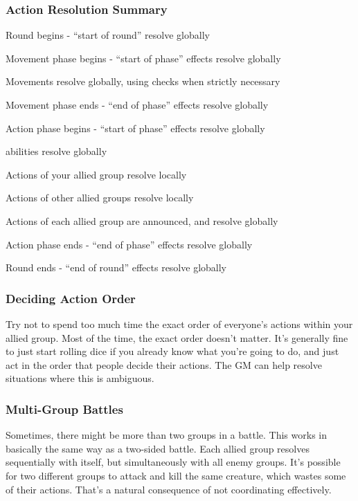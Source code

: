     \subsubsection{Action Resolution Summary}
      \begin{enumerate*}
        \item Round begins - ``start of round'' resolve globally
        \item Movement phase begins - ``start of phase'' effects resolve globally
        \item Movements resolve globally, using  checks when strictly necessary
        \item Movement phase ends - ``end of phase'' effects resolve globally
        \item Action phase begins - ``start of phase'' effects resolve globally
        \item {} abilities resolve globally
        \item Actions of your allied group resolve locally
        \item Actions of other allied groups resolve locally
        \item Actions of each allied group are announced, and resolve globally
        \item Action phase ends - ``end of phase'' effects resolve globally
        \item Round ends - ``end of round'' effects resolve globally
      \end{enumerate*}

    \subsubsection{Deciding Action Order}\label{Deciding Action Order}
      Try not to spend too much time the exact order of everyone's actions within your allied group.
      Most of the time, the exact order doesn't matter.
      It's generally fine to just start rolling dice if you already know what you're going to do, and just act in the order that people decide their actions.
      The GM can help resolve situations where this is ambiguous.

    \subsubsection{Multi-Group Battles}\label{Multi-Group Battles}
      Sometimes, there might be more than two groups in a battle.
      This works in basically the same way as a two-sided battle.
      Each allied group resolves sequentially with itself, but simultaneously with all enemy groups.
      It's possible for two different groups to attack and kill the same creature, which wastes some of their actions.
      That's a natural consequence of not coordinating effectively.

